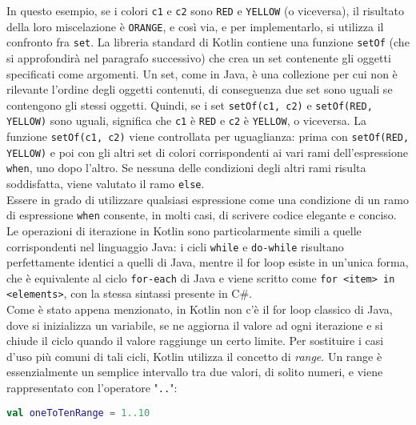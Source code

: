 In questo esempio, se i colori \texttt{c1} e \texttt{c2} sono \texttt{RED} e \texttt{YELLOW} (o viceversa), il risultato della loro miscelazione è \texttt{ORANGE}, e così via, e per implementarlo, si utilizza il confronto fra \texttt{set}. La libreria standard di Kotlin contiene una funzione \texttt{setOf} (che si approfondirà nel paragrafo successivo) che crea un set contenente gli oggetti specificati come argomenti. Un set, come in Java, è una collezione per cui non è rilevante l'ordine degli oggetti contenuti, di conseguenza due set sono uguali se contengono gli stessi oggetti. Quindi, se i set \texttt{setOf(c1, c2)} e \texttt{setOf(RED, YELLOW)} sono uguali, significa che \texttt{c1} è \texttt{RED} e \texttt{c2} è \texttt{YELLOW}, o viceversa. La funzione \texttt{setOf(c1, c2)} viene controllata per uguaglianza: prima con \texttt{setOf(RED, YELLOW)} e poi con gli altri set di colori corrispondenti ai vari rami dell’espressione \texttt{when}, uno dopo l'altro. Se nessuna delle condizioni degli altri rami risulta soddisfatta, viene valutato il ramo \texttt{else}.\\
Essere in grado di utilizzare qualsiasi espressione come una condizione di un ramo di espressione \texttt{when} consente, in molti casi, di scrivere codice elegante e conciso.\\
Le operazioni di iterazione in Kotlin sono particolarmente simili a quelle corrispondenti nel linguaggio Java: i cicli \texttt{while} e \texttt{do-while} risultano perfettamente identici a quelli di Java, mentre il for loop esiste in un’unica forma, che è equivalente al ciclo \texttt{for-each} di Java e viene scritto come \texttt{for <item> in <elements>}, con la stessa sintassi presente in C\#.\\
Come è stato appena menzionato, in Kotlin non c'è il for loop classico di Java, dove si inizializza un variabile, se ne aggiorna il valore ad ogni iterazione e si chiude il ciclo quando il valore raggiunge un certo limite. Per sostituire i casi d’uso più comuni di tali cicli, Kotlin utilizza il concetto di {\em range}. Un range è essenzialmente un semplice intervallo tra due valori, di solito numeri, e viene rappresentato con l’operatore "\texttt{..}":\\

\begin{lstlisting}[caption={Utilizzo dell'operatore di range}, captionpos=b, label={lst:exampleRange}, language=Kotlin]
val oneToTenRange = 1..10
\end{lstlisting}

